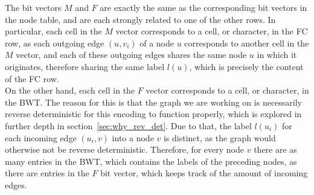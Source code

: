 \documentclass[a4paper,12pt,twoside,BCOR=10mm]{scrbook}
\begin{document}
The bit vectors $ M $ and $ F $ are exactly the same as the corresponding bit vectors in the node table,
and are each strongly related to one of the other rows.
In particular, each cell in the $ M $ vector corresponds to a cell, or character, in the FC row,
as each outgoing edge $ (u, v_i) $ of a node $ u $ corresponds to another cell in the $ M $ vector, and each
of these outgoing edges shares the same node $ u $ in which it originates, therefore sharing the same label $ l ( u ) $,
which is precisely the content of the FC row. \\
On the other hand, each cell in the $ F $ vector corresponds to a cell, or character, in the BWT.
The reason for this is that the graph we are working on is necessarily reverse deterministic
for this encoding to function properly, which is explored in further depth in section~\ref{sec:why_rev_det}.
Due to that, the label $ l (u_i) $ for each incoming edge $ (u_i, v) $ into a node $ v $ is distinct,
as the graph would otherwise not be reverse deterministic.
Therefore, for every node $ v $ there are as many entries in the BWT, which contains the labels of the preceding nodes,
as there are entries in the $ F $ bit vector, which keeps track of the amount of incoming edges.
\end{document}

